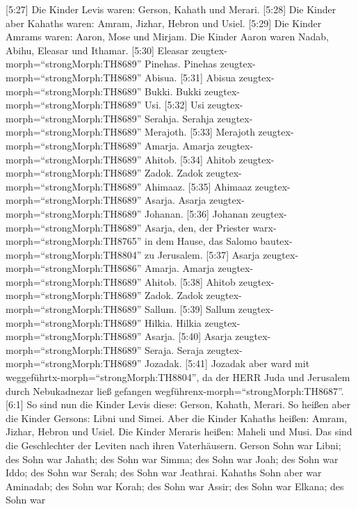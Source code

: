  {[}5:27{]} Die Kinder Levis waren: Gerson, Kahath und
Merari.  {[}5:28{]} Die Kinder aber Kahaths waren: Amram,
Jizhar, Hebron und Usiel.  {[}5:29{]} Die Kinder Amrams
waren: Aaron, Mose und Mirjam. Die Kinder Aaron waren Nadab, Abihu,
Eleasar und Ithamar.  {[}5:30{]} Eleasar
zeugtex-morph=``strongMorph:TH8689'' Pinehas. Pinehas
zeugtex-morph=``strongMorph:TH8689'' Abisua.  {[}5:31{]}
Abisua zeugtex-morph=``strongMorph:TH8689'' Bukki. Bukki
zeugtex-morph=``strongMorph:TH8689'' Usi.  {[}5:32{]} Usi
zeugtex-morph=``strongMorph:TH8689'' Serahja. Serahja
zeugtex-morph=``strongMorph:TH8689'' Merajoth.  {[}5:33{]}
Merajoth zeugtex-morph=``strongMorph:TH8689'' Amarja. Amarja
zeugtex-morph=``strongMorph:TH8689'' Ahitob.  {[}5:34{]}
Ahitob zeugtex-morph=``strongMorph:TH8689'' Zadok. Zadok
zeugtex-morph=``strongMorph:TH8689'' Ahimaaz.  {[}5:35{]}
Ahimaaz zeugtex-morph=``strongMorph:TH8689'' Asarja. Asarja
zeugtex-morph=``strongMorph:TH8689'' Johanan.  {[}5:36{]}
Johanan zeugtex-morph=``strongMorph:TH8689'' Asarja, den, der Priester
warx-morph=``strongMorph:TH8765'' in dem Hause, das Salomo
bautex-morph=``strongMorph:TH8804'' zu Jerusalem. 
{[}5:37{]} Asarja zeugtex-morph=``strongMorph:TH8686'' Amarja. Amarja
zeugtex-morph=``strongMorph:TH8689'' Ahitob.  {[}5:38{]}
Ahitob zeugtex-morph=``strongMorph:TH8689'' Zadok. Zadok
zeugtex-morph=``strongMorph:TH8689'' Sallum.  {[}5:39{]}
Sallum zeugtex-morph=``strongMorph:TH8689'' Hilkia. Hilkia
zeugtex-morph=``strongMorph:TH8689'' Asarja.  {[}5:40{]}
Asarja zeugtex-morph=``strongMorph:TH8689'' Seraja. Seraja
zeugtex-morph=``strongMorph:TH8689'' Jozadak.  {[}5:41{]}
Jozadak aber ward mit weggeführtx-morph=``strongMorph:TH8804'', da der
HERR Juda und Jerusalem durch Nebukadnezar ließ gefangen
wegführenx-morph=``strongMorph:TH8687''.  {[}6:1{]} So sind
nun die Kinder Levis diese: Gerson, Kahath, Merari.  So
heißen aber die Kinder Gersons: Libni und Simei.  Aber die
Kinder Kahaths heißen: Amram, Jizhar, Hebron und Usiel. 
Die Kinder Meraris heißen: Maheli und Musi. Das sind die Geschlechter
der Leviten nach ihren Vaterhäusern.  Gerson Sohn war
Libni; des Sohn war Jahath; des Sohn war Simma;  des Sohn
war Joah; des Sohn war Iddo; des Sohn war Serah; des Sohn war Jeathrai.
 Kahaths Sohn aber war Aminadab; des Sohn war Korah; des
Sohn war Assir;  des Sohn war Elkana; des Sohn war
